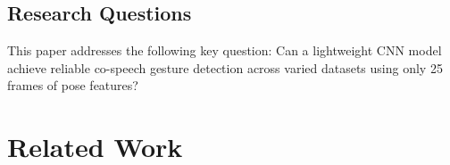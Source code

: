 \iffalse %
\subsection{Research Questions}
This paper addresses the following key question:
 Can a lightweight CNN model achieve reliable co-speech gesture detection across varied datasets using only 25 frames of pose features?



\section{Related Work}\label{sec:related}

